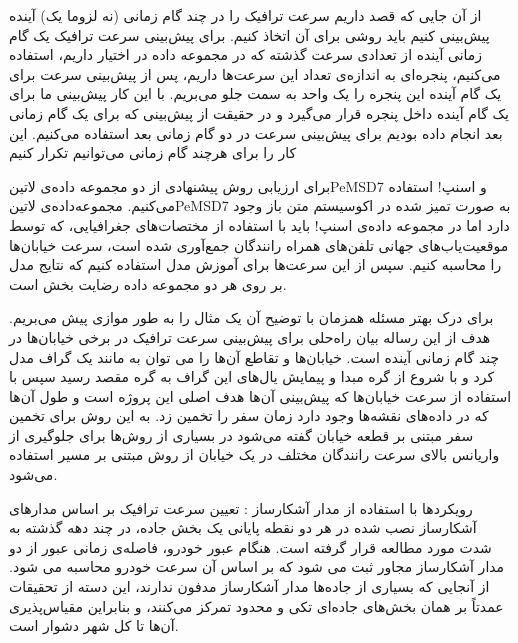 از آن جایی که قصد داریم سرعت ترافیک را در چند گام زمانی (نه لزوما یک) آینده پیش‌بینی کنیم باید روشی برای آن اتخاذ کنیم. برای پیش‌بینی سرعت ترافیک یک گام زمانی آینده از تعدادی سرعت گذشته که در مجموعه داده در اختیار داریم، استفاده می‌کنیم، پنجره‌ای به اندازه‌ی تعداد این سرعت‌ها داریم، پس از پیش‌بینی سرعت برای یک گام آینده این پنجره را یک واحد به سمت جلو می‌بریم. با این کار پیش‌بینی ما برای یک گام آینده داخل پنجره قرار می‌گیرد و در حقیقت از پیش‌بینی که برای یک گام زمانی بعد انجام داده بودیم برای پیش‌بینی سرعت در دو گام زمانی بعد استفاده می‌کنیم. این کار را برای هرچند گام زمانی می‌توانیم تکرار کنیم

برای ارزیابی روش پیشنهادی از دو مجموعه داده‌ی ‌لاتین{PeMSD7} و اسنپ! استفاده می‌کنیم. مجموعه‌داده‌ی ‌لاتین{PeMSD7} به صورت تمیز شده در اکوسیستم متن باز وجود دارد
اما در مجموعه داده‌ی اسنپ! باید با استفاده از مختصات‌های جغرافیایی، که توسط موقعیت‌یاب‌های
جهانی تلفن‌های همراه رانندگان جمع‌آوری شده است، سرعت خیابان‌ها را محاسبه کنیم.
سپس از این سرعت‌ها برای آموزش مدل استفاده کنیم که نتایج مدل بر روی هر دو مجموعه داده رضایت بخش است.


برای درک بهتر مسئله همزمان با توضیح آن یک مثال را به طور موازی پیش می‌بریم.
هدف از این رساله بیان راه‌حلی برای پیش‌بینی سرعت ترافیک در برخی خیابان‌ها در چند گام زمانی آینده است. خیابان‌ها و تقاطع آن‌ها را می توان به مانند یک گراف مدل کرد و با شروع از گره مبدا و پیمایش یال‌های این گراف به گره مقصد رسید سپس با استفاده از سرعت خیابان‌ها که پیش‌بینی آن‌ها هدف اصلی این پروژه است و طول آن‌ها که در داده‌های نقشه‌ها وجود دارد زمان سفر را تخمین زد. به این روش برای تخمین سفر مبتنی بر قطعه خیابان  گفته می‌شود در بسیاری از روش‌ها برای جلوگیری از واریانس بالای سرعت رانندگان مختلف در یک خیابان از روش مبتنی بر مسیر  استفاده می‌شود.

رویکردها با استفاده از مدار آشکارساز : تعیین سرعت ترافیک بر اساس مدارهای آشکارساز نصب شده در هر دو نقطه پایانی یک بخش جاده، در چند دهه گذشته به شدت مورد مطالعه قرار گرفته است. هنگام عبور خودرو، فاصله‌ی زمانی عبور از دو مدار آشکارساز مجاور ثبت می شود که بر اساس آن سرعت خودرو محاسبه می شود. از آنجایی که بسیاری از جاده‌ها مدار آشکارساز مدفون ندارند، این دسته از تحقیقات عمدتاً بر همان بخش‌های جاده‌ای تکی و محدود تمرکز می‌کنند، و بنابراین مقیاس‌پذیری آن‌ها تا کل شهر دشوار است.


